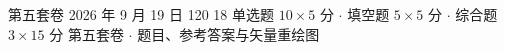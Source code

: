 \documentclass[11pt,a4paper,fontset=none]{ctexart}
\begin{document}
\raggedbottom

\makecover
  {第五套卷}
  {2026 年 9 月 19 日}
  {120}
  {18}
  {单选题 \(10\times5\) 分 \(\cdot\)
   填空题 \(5\times5\) 分 \(\cdot\)
   综合题 \(3\times15\) 分}
  {第五套卷 \(\cdot\) 题目、参考答案与矢量重绘图}



\solutiondivider

\end{document}
